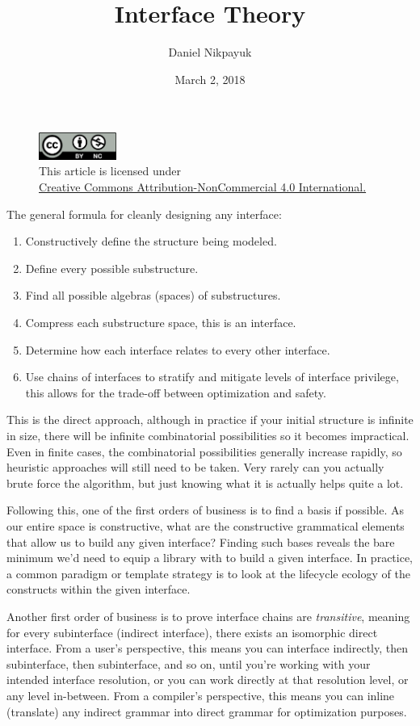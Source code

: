 \documentclass[twoside]{article}
\title{Interface Theory}
\author{Daniel Nikpayuk}
\date{March 2, 2018}
\begin{document}
\maketitle
\thispagestyle{empty}

\begin{figure}[h]
\centering
\includegraphics[width=1in]{../../../cc-by-nc.png}\\[0.1in]
\tiny This article is licensed under \\
\href{http://creativecommons.org/licenses/by-nc/4.0/}
{Creative Commons Attribution-NonCommercial 4.0 International.}\\[0.3in]
\end{figure}

The general formula for cleanly designing any interface:

\begin{enumerate}
\item Constructively define the structure being modeled.
\item Define every possible substructure.
\item Find all possible algebras (spaces) of substructures.
\item Compress each substructure space, this is an interface.
\item Determine how each interface relates to every other interface.
\item Use chains of interfaces to stratify and mitigate levels of interface privilege,
      this allows for the trade-off between optimization and safety.
\end{enumerate}

This is the direct approach, although in practice if your initial structure is infinite in size, there will be infinite combinatorial
possibilities so it becomes impractical. Even in finite cases, the combinatorial possibilities generally increase rapidly,
so heuristic approaches will still need to be taken. Very rarely can you actually brute force the algorithm,
but just knowing what it is actually helps quite a lot.

Following this, one of the first orders of business is to find a basis if possible. As our entire space is constructive,
what are the constructive grammatical elements that allow us to build any given interface? Finding such bases reveals
the bare minimum we'd need to equip a library with to build a given interface. In practice, a common paradigm or template
strategy is to look at the lifecycle ecology of the constructs within the given interface.

Another first order of business is to prove interface chains are \emph{transitive}, meaning for every subinterface
(indirect interface), there exists an isomorphic direct interface. From a user's perspective, this means you can interface
indirectly, then subinterface, then subinterface, and so on, until you're working with your intended interface resolution,
or you can work directly at that resolution level, or any level in-between. From a compiler's perspective, this means
you can inline (translate) any indirect grammar into direct grammar for optimization purposes.
\end{document}
